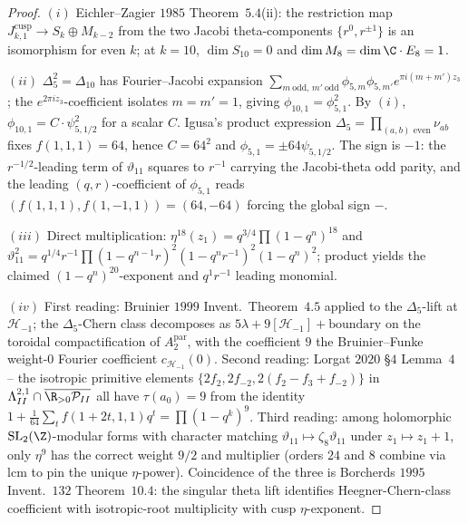 \begin{proof}
$(i)$ Eichler--Zagier $1985$ Theorem~$5.4$(ii): the restriction map
$J_{k,1}^{\mathrm{cusp}}\to S_k\oplus M_{k-2}$ from the two Jacobi
theta-components $\{r^0,r^{\pm 1}\}$ is an isomorphism for even $k$;
at $k=10$, $\dim S_{10}=0$ and $\dim M_8 = \dim \C\cdot E_8 = 1$.

$(ii)$ $\Delta_5^2 = \Delta_{10}$ has Fourier--Jacobi expansion
$\sum_{m\ \mathrm{odd},\,m'\ \mathrm{odd}}\phi_{5,m}\phi_{5,m'}
e^{\pi i(m+m')z_3}$; the $e^{2\pi i z_3}$-coefficient isolates
$m=m'=1$, giving $\phi_{10,1}=\phi_{5,1}^2$. By $(i)$, $\phi_{10,1} =
C\cdot\psi_{5,1/2}^2$ for a scalar $C$. Igusa's product expression
$\Delta_5 = \prod_{(a,b)\text{ even}}\nu_{ab}$ fixes $f(1,1,1)=64$,
hence $C=64^2$ and $\phi_{5,1} = \pm 64\psi_{5,1/2}$. The sign is
$-1$: the $r^{-1/2}$-leading term of $\vartheta_{11}$ squares to
$r^{-1}$ carrying the Jacobi-theta odd parity, and the leading $(q,r)
$-coefficient of $\phi_{5,1}$ reads $(f(1,1,1),f(1,-1,1)) = (64,-64)$
forcing the global sign $-$.

$(iii)$ Direct multiplication: $\eta^{18}(z_1) = q^{3/4}\prod(1-q^n)^{18}$
and $\vartheta_{11}^2 = q^{1/4}r^{-1}\prod(1-q^{n-1}r)^2(1-q^{n}r^{-1})^2(1-q^n)^2$;
product yields the claimed $(1-q^n)^{20}$-exponent and $q^1 r^{-1}$
leading monomial.

$(iv)$ First reading: Bruinier $1999$ Invent.\ Theorem~$4.5$ applied
to the $\Delta_5$-lift at $\mathcal H_{-1}$; the $\Delta_5$-Chern
class decomposes as $5\lambda + 9[\mathcal H_{-1}]+\text{boundary}$
on the toroidal compactification of $A_2^{\mathrm{par}}$, with the
coefficient $9$ the Bruinier--Funke weight-$0$ Fourier coefficient
$c_{\mathcal H_{-1}}(0)$. Second reading: Lorgat $2020$ \S$4$
Lemma~$4$ -- the isotropic primitive elements $\{2f_2, 2f_{-2},
2(f_2-f_3+f_{-2})\}$ in $\Lambda^{2,1}_{II}\cap\overline{\R_{>0}
\mathcal P_{II}}$ all have $\tau(a_0)=9$ from the identity
$1+\frac{1}{64}\sum_t f(1+2t,1,1)q^t = \prod(1-q^k)^9$. Third
reading: among holomorphic $\mathrm{SL}_2(\Z)$-modular forms with
character matching $\vartheta_{11}\mapsto \zeta_8\vartheta_{11}$
under $z_1\mapsto z_1+1$, only $\eta^9$ has the correct weight $9/2$
and multiplier (orders $24$ and $8$ combine via $\mathrm{lcm}$ to
pin the unique $\eta$-power). Coincidence of the three is Borcherds
$1995$ Invent.\ $132$ Theorem~$10.4$: the singular theta lift
identifies Heegner-Chern-class coefficient with isotropic-root
multiplicity with cusp $\eta$-exponent.
\end{proof}

